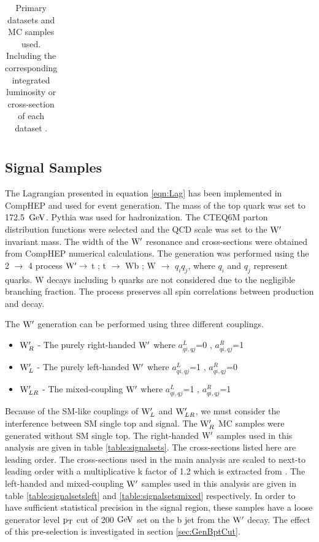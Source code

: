 \begin{table}
\begin{center}
\begin{tabular}{p{0.7\linewidth}|c}
\end{tabular}
\end{center}
\caption{Primary datasets and MC samples used. Including the corresponding integrated luminosity or cross-section of each dataset \cite{Czakon:2013goa,Kidonakis:2012db}.}
\label{table:datasets}
\end{table}

\subsection{Signal Samples}
\label{sec:signal}
The Lagrangian presented in equation \ref{eqn:Lag} has been implemented in CompHEP \cite{CompHEP} and used for event generation.  The mass of the top 
quark was set to 172.5~$\mathrm{GeV}$.  
Pythia was used for hadronization. The CTEQ6M parton distribution functions were selected and the QCD scale was set to the $\mathrm{W}^\prime$ invariant mass.  The width of 
the $\mathrm{W}^\prime$ resonance and cross-sections were obtained from CompHEP numerical calculations.  The generation was performed using the 2 $\rightarrow$ 4 
process $\mathrm{W}^\prime \rightarrow$ t ; t $\rightarrow$ Wb ; W $\rightarrow$ $q_{i}q_{j}$, where $q_{i}$ and $q_{j}$ represent quarks.  
W decays including b quarks are not considered due to the negligible branching fraction.  The process 
preserves all spin correlations between production and decay.

The $\mathrm{W}^\prime$ generation can be performed using three different couplings. 
\begin{itemize}
\item {\bf $\mathrm{W}^\prime_{R}$} - The purely right-handed $\mathrm{W}^\prime$ where $a_{qi,qj}^{L}$=0 , $a_{qi,qj}^{R}$=1 
\item {\bf $\mathrm{W}^\prime_{L}$} - The purely left-handed $\mathrm{W}^\prime$ where $a_{qi,qj}^{L}$=1 , $a_{qi,qj}^{R}$=0 
\item {\bf $\mathrm{W}^\prime_{LR}$} - The mixed-coupling $\mathrm{W}^\prime$ where $a_{qi,qj}^{L}$=1 , $a_{qi,qj}^{R}$=1 
\end{itemize}

Because of the SM-like couplings of $\mathrm{W}^\prime_{L}$ and $\mathrm{W}^\prime_{LR}$, we must consider the 
interference between SM single top and signal.  The $\mathrm{W}^\prime_{R}$ MC samples were generated without SM single top.  The right-handed $\mathrm{W}^\prime$ samples used in this analysis are given in table
\ref{table:signalsets}.  The cross-sections listed here are leading order.  The cross-sections 
used in the main analysis are scaled to next-to leading order with a multiplicative k factor of 1.2
which is extracted from \cite{kfactor}.  The left-handed and mixed-coupling $\mathrm{W}^\prime$ samples used 
in this analysis are given in table \ref{table:signalsetsleft} and \ref{table:signalsetsmixed} respectively.
In order to have sufficient statistical precision in the signal region, these samples have a loose generator 
level $\mathrm{p_{T}}$ cut of 200$~\mathrm{GeV}$ set on the b jet from the $\mathrm{W}^\prime$ decay.  The effect of this pre-selection is investigated in section \ref{sec:GenBptCut}.

